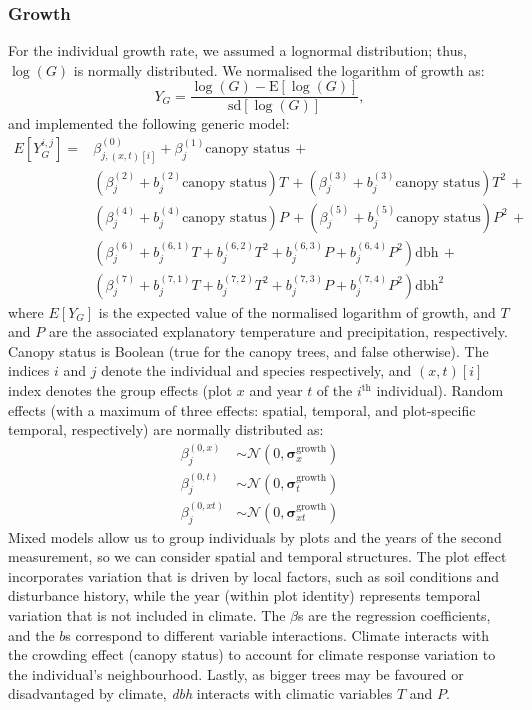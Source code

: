 \subsubsection{Growth}
For the individual growth rate, we assumed a lognormal distribution; thus, $ \log(G) $ is normally distributed. We normalised the logarithm of growth as:
\[
	Y_{G} = \frac{\log(G) - \mathrm{E}[\log(G)]}{\mathrm{sd}[\log(G)]},
\]
and implemented the following generic model:
\begin{equation} \label{eq::glmm_growth}
\begin{split}
	E[Y_G^{i, j}] = & \beta_{j, (x, t)[i]}^{(0)} + \beta_j^{(1)}  \text{canopy status} \, + \\
	& \left(\beta_j^{(2)} + b_j^{(2)} \text{canopy status} \right) T \, +
	\left(\beta_j^{(3)} + b_j^{(3)} \text{canopy status} \right) T^2 \, + \\
	& \left(\beta_j^{(4)} + b_j^{(4)} \text{canopy status} \right) P \, +
	\left(\beta_j^{(5)} + b_j^{(5)} \text{canopy status} \right) P^2 \, + \\
	& \left( \beta_j^{(6)} + b_j^{(6, 1)} T + b_j^{(6, 2)} T^2 +
		b_j^{(6, 3)} P + b_j^{(6, 4)} P^2 \right) \text{dbh} \, + \\
	& \left( \beta_j^{(7)} + b_j^{(7, 1)} T + b_j^{(7, 2)} T^2 +
		b_j^{(7, 3)} P + b_j^{(7, 4)} P^2 \right) \text{dbh}^2
\end{split}
\end{equation}
where $ E[Y_G] $ is the expected value of the normalised logarithm of growth, and $ T $ and $ P $ are the associated explanatory temperature and precipitation, respectively. Canopy status is Boolean (true for the canopy trees, and false otherwise). The indices $ i $ and $ j $ denote the individual and species respectively, and $ (x, t)[i] $ index denotes the group effects (plot $ x $ and year $ t $ of the $ i^{\text{th}} $ individual). Random effects (with a maximum of three effects: spatial, temporal, and plot-specific temporal, respectively) are normally distributed as:
\begin{align*}
	\beta_{j}^{(0, x)} &\sim \mathcal{N}(0, \bm{\sigma}_{x}^{\text{growth}}) \\
	\beta_{j}^{(0, t)} &\sim \mathcal{N}(0, \bm{\sigma}_{t}^{\text{growth}}) \\
	\beta_{j}^{(0, xt)} &\sim \mathcal{N}(0, \bm{\sigma}_{xt}^{\text{growth}})
\end{align*}
Mixed models allow us to group individuals by plots and the years of the second measurement, so we can consider spatial and temporal structures. The plot effect incorporates variation that is driven by local factors, such as soil conditions and disturbance history, while the year (within plot identity) represents temporal variation that is not included in climate. The $ \beta $s are the regression coefficients, and the $ b $s correspond to different variable interactions. Climate interacts with the crowding effect (canopy status) to account for climate response variation to the individual's neighbourhood. Lastly, as bigger trees may be favoured or disadvantaged by climate, \textit{dbh} interacts with climatic variables $ T $ and $ P $. \\

